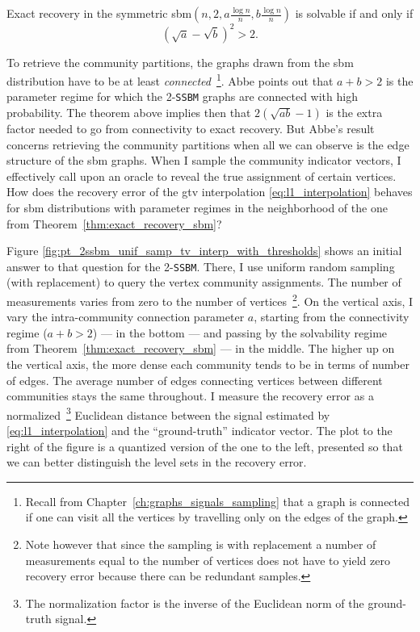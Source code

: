 \begin{theorem}
    Exact recovery in the symmetric \acrshort{sbm}$\left(n, 2, a \frac{\log n}{n}, b \frac{\log n}{n}\right)$ is solvable if and only if
    \begin{equation}
        \left(\sqrt{a} - \sqrt{b}\right)^2 > 2.
    \end{equation}
    \label{thm:exact_recovery_sbm}
\end{theorem}

To retrieve the community partitions, the graphs drawn from the \acrshort{sbm} distribution have to be at least \emph{connected}~\footnote{Recall from Chapter~\ref{ch:graphs_signals_sampling} that a graph is connected if one can visit all the vertices by travelling only on the edges of the graph.}. Abbe \cite{abbe2018} points out that $a + b > 2$ is the parameter regime for which the 2-\texttt{SSBM} graphs are connected with high probability. The theorem above implies then that $2(\sqrt{ab} - 1)$ is the extra factor needed to go from connectivity to exact recovery. But Abbe's result concerns retrieving the community partitions when all we can observe is the edge structure of the \acrshort{sbm} graphs. When I sample the community indicator vectors, I effectively call upon an oracle to reveal the true assignment of certain vertices. How does the recovery error of the \acrshort{gtv} interpolation \eqref{eq:l1_interpolation} behaves for \acrshort{sbm} distributions with parameter regimes in the neighborhood of the one from Theorem~\ref{thm:exact_recovery_sbm}?

Figure \ref{fig:pt_2ssbm_unif_samp_tv_interp_with_thresholds} shows an initial answer to that question for the 2-\texttt{SSBM}. There, I use uniform random sampling (with replacement) to query the vertex community assignments. The number of measurements varies from zero to the number of vertices~\footnote{Note however that since the sampling is with replacement a number of measurements equal to the number of vertices does not have to yield zero recovery error because there can be redundant samples.}. On the vertical axis, I vary the intra-community connection parameter $a$, starting from the connectivity regime ($a + b > 2$) --- in the bottom --- and passing by the solvability regime from Theorem~\ref{thm:exact_recovery_sbm} --- in the middle. The higher up on the vertical axis, the more dense each community tends to be in terms of number of edges. The average number of edges connecting vertices between different communities stays the same throughout. I measure the recovery error as a normalized~\footnote{The normalization factor is the inverse of the Euclidean norm of the ground-truth signal.} Euclidean distance between the signal estimated by \eqref{eq:l1_interpolation} and the ``ground-truth'' indicator vector. The plot to the right of the figure is a quantized version of the one to the left, presented so that we can better distinguish the level sets in the recovery error.

